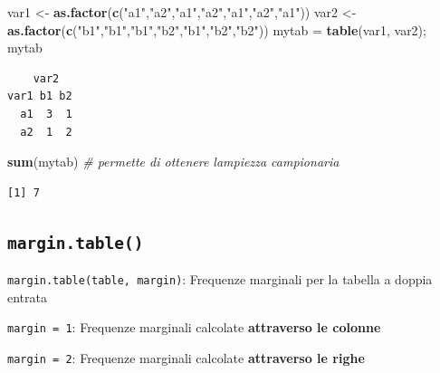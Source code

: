 \documentclass[
  a4paper,
  DIV=11,
  numbers=noendperiod]{scrreprt}
\newenvironment{Shaded}{\begin{snugshade}}{\end{snugshade}}
\newcommand{\CommentTok}[1]{\textcolor[rgb]{0.56,0.35,0.01}{\textit{#1}}}
\newcommand{\FunctionTok}[1]{\textcolor[rgb]{0.13,0.29,0.53}{\textbf{#1}}}
\newcommand{\NormalTok}[1]{#1}
\newcommand{\OtherTok}[1]{\textcolor[rgb]{0.56,0.35,0.01}{#1}}
\newcommand{\StringTok}[1]{\textcolor[rgb]{0.31,0.60,0.02}{#1}}
\begin{document}
\begin{Shaded}
\begin{Highlighting}[]
\NormalTok{var1 }\OtherTok{\textless{}{-}} \FunctionTok{as.factor}\NormalTok{(}\FunctionTok{c}\NormalTok{(}\StringTok{"a1"}\NormalTok{,}\StringTok{"a2"}\NormalTok{,}\StringTok{"a1"}\NormalTok{,}\StringTok{"a2"}\NormalTok{,}\StringTok{"a1"}\NormalTok{,}\StringTok{"a2"}\NormalTok{,}\StringTok{"a1"}\NormalTok{))  }
\NormalTok{var2 }\OtherTok{\textless{}{-}} \FunctionTok{as.factor}\NormalTok{(}\FunctionTok{c}\NormalTok{(}\StringTok{"b1"}\NormalTok{,}\StringTok{"b1"}\NormalTok{,}\StringTok{"b1"}\NormalTok{,}\StringTok{"b2"}\NormalTok{,}\StringTok{"b1"}\NormalTok{,}\StringTok{"b2"}\NormalTok{,}\StringTok{"b2"}\NormalTok{)) }
\NormalTok{mytab }\OtherTok{=} \FunctionTok{table}\NormalTok{(var1, var2); mytab}
\end{Highlighting}
\end{Shaded}

\begin{verbatim}
    var2
var1 b1 b2
  a1  3  1
  a2  1  2
\end{verbatim}

\begin{Shaded}
\begin{Highlighting}[]
\FunctionTok{sum}\NormalTok{(mytab) }\CommentTok{\# permette di ottenere l\textquotesingle{}ampiezza campionaria}
\end{Highlighting}
\end{Shaded}

\begin{verbatim}
[1] 7
\end{verbatim}

\subsection{\texorpdfstring{\texttt{margin.table()}}{margin.table()}}\label{margin.table}

\texttt{margin.table(table,\ margin)}: Frequenze marginali per la
tabella a doppia entrata

\begin{tcolorbox}[enhanced jigsaw, toprule=.15mm, left=2mm, leftrule=.75mm, breakable, coltitle=black, title={Tip}, bottomtitle=1mm, opacitybacktitle=0.6, toptitle=1mm, titlerule=0mm, bottomrule=.15mm, colframe=quarto-callout-tip-color-frame, arc=.35mm, rightrule=.15mm, opacityback=0, colbacktitle=quarto-callout-tip-color!10!white, colback=white]

\texttt{margin\ =\ 1}: Frequenze marginali calcolate \textbf{attraverso
le colonne}

\texttt{margin\ =\ 2}: Frequenze marginali calcolate \textbf{attraverso
le righe}

\end{tcolorbox}
\end{document}
